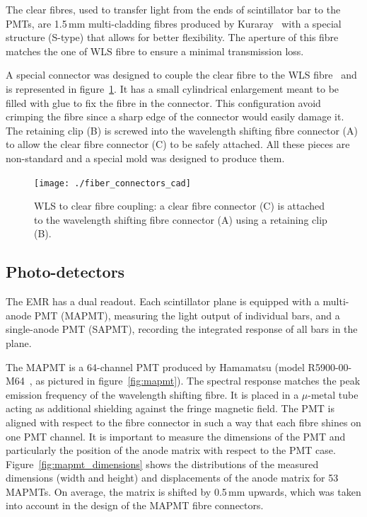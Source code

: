 \documentclass[a4paper,11pt]{article}
\begin{document}
The clear fibres, used to transfer light from the ends of scintillator bar to the PMTs, are 1.5\,mm multi-cladding fibres produced by 
Kuraray~\cite{kuraray} with a special structure (S-type) that allows for better flexibility. The aperture of this fibre matches
the one of WLS fibre to ensure a minimal transmission loss.

A special connector was designed to couple the clear fibre to the WLS fibre~\cite{emr_design_change} and is represented in figure~\ref{fig:fibre_connectors_cad}. It has a small
cylindrical enlargement meant to be filled with glue to fix the fibre in the connector. This configuration avoid crimping the fibre since a sharp edge of the connector would easily damage it. The retaining clip (B) is screwed into the wavelength shifting fibre connector (A) to allow the clear fibre connector (C) to be safely attached. 
All these pieces are non-standard and a special mold was designed to produce them. 

\begin{figure}[htp!]
 \centering
 \texttt{[image: ./fiber\_connectors\_cad]}
 \caption[Clear fibre connector]{WLS to clear fibre coupling: a clear fibre connector (C) is attached to the wavelength shifting fibre connector (A) using a retaining clip (B).}
 \label{fig:fibre_connectors_cad}
\end{figure}

\subsection{Photo-detectors}
The EMR has a dual readout. Each scintillator plane is equipped with a multi-anode PMT (MAPMT), measuring
the light output of individual bars, and a single-anode PMT (SAPMT), recording the integrated response of all bars in the plane. 

The MAPMT is a 64-channel PMT produced by Hamamatsu (model R5900-00-M64~\cite{hamamatsu_mapmt}, as pictured in
figure~\ref{fig:mapmt}). The spectral response matches the peak emission frequency of the wavelength shifting fibre. It is 
placed in a $\mu$-metal tube acting as additional shielding against the fringe magnetic field.
The PMT is aligned with respect to the fibre connector in such a way that each fibre shines on one
PMT channel. It is important to measure the dimensions of the PMT and particularly the position of the anode matrix with respect to the
PMT case. Figure~\ref{fig:mapmt_dimensions} shows the distributions of the measured dimensions (width and
height) and displacements of the anode matrix for 53 MAPMTs. On average, the matrix is shifted by 0.5\,mm upwards, which was taken into account in the design of the
MAPMT fibre connectors.
\end{document}
